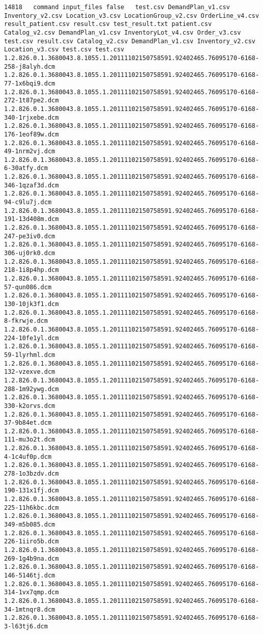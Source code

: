 \begin{lstlisting}
14818	command	input_files	false	test.csv DemandPlan_v1.csv Inventory_v2.csv Location_v3.csv LocationGroup_v2.csv OrderLine_v4.csv result_patient.csv result.csv test_result.txt patient.csv Catalog_v2.csv DemandPlan_v1.csv InventoryLot_v4.csv Order_v3.csv test.csv result.csv Catalog_v2.csv DemandPlan_v1.csv Inventory_v2.csv Location_v3.csv test.csv test.csv 1.2.826.0.1.3680043.8.1055.1.20111102150758591.92402465.76095170-6168-258-j8alyh.dcm 1.2.826.0.1.3680043.8.1055.1.20111102150758591.92402465.76095170-6168-77-1x6bqi9.dcm 1.2.826.0.1.3680043.8.1055.1.20111102150758591.92402465.76095170-6168-272-1t87pe2.dcm 1.2.826.0.1.3680043.8.1055.1.20111102150758591.92402465.76095170-6168-340-1rjxebe.dcm 1.2.826.0.1.3680043.8.1055.1.20111102150758591.92402465.76095170-6168-176-1eof89w.dcm 1.2.826.0.1.3680043.8.1055.1.20111102150758591.92402465.76095170-6168-49-1nrm2vj.dcm 1.2.826.0.1.3680043.8.1055.1.20111102150758591.92402465.76095170-6168-6-30atfy.dcm 1.2.826.0.1.3680043.8.1055.1.20111102150758591.92402465.76095170-6168-346-1qzaf3d.dcm 1.2.826.0.1.3680043.8.1055.1.20111102150758591.92402465.76095170-6168-94-c9lu7j.dcm 1.2.826.0.1.3680043.8.1055.1.20111102150758591.92402465.76095170-6168-191-13d408m.dcm 1.2.826.0.1.3680043.8.1055.1.20111102150758591.92402465.76095170-6168-247-pe3iv0.dcm 1.2.826.0.1.3680043.8.1055.1.20111102150758591.92402465.76095170-6168-306-uj0rk0.dcm 1.2.826.0.1.3680043.8.1055.1.20111102150758591.92402465.76095170-6168-218-1i8p4hp.dcm 1.2.826.0.1.3680043.8.1055.1.20111102150758591.92402465.76095170-6168-57-qun086.dcm 1.2.826.0.1.3680043.8.1055.1.20111102150758591.92402465.76095170-6168-130-10jk3f1.dcm 1.2.826.0.1.3680043.8.1055.1.20111102150758591.92402465.76095170-6168-8-fkrwje.dcm 1.2.826.0.1.3680043.8.1055.1.20111102150758591.92402465.76095170-6168-224-10fe1yl.dcm 1.2.826.0.1.3680043.8.1055.1.20111102150758591.92402465.76095170-6168-59-1lyrhml.dcm 1.2.826.0.1.3680043.8.1055.1.20111102150758591.92402465.76095170-6168-132-vzexve.dcm 1.2.826.0.1.3680043.8.1055.1.20111102150758591.92402465.76095170-6168-288-1m92ywg.dcm 1.2.826.0.1.3680043.8.1055.1.20111102150758591.92402465.76095170-6168-330-k2orvs.dcm 1.2.826.0.1.3680043.8.1055.1.20111102150758591.92402465.76095170-6168-37-9b84et.dcm 1.2.826.0.1.3680043.8.1055.1.20111102150758591.92402465.76095170-6168-111-mu3o2t.dcm 1.2.826.0.1.3680043.8.1055.1.20111102150758591.92402465.76095170-6168-4-1c4uf0p.dcm 1.2.826.0.1.3680043.8.1055.1.20111102150758591.92402465.76095170-6168-278-1o3bzdv.dcm 1.2.826.0.1.3680043.8.1055.1.20111102150758591.92402465.76095170-6168-190-131x1fj.dcm 1.2.826.0.1.3680043.8.1055.1.20111102150758591.92402465.76095170-6168-225-11h6kbc.dcm 1.2.826.0.1.3680043.8.1055.1.20111102150758591.92402465.76095170-6168-349-m5b085.dcm 1.2.826.0.1.3680043.8.1055.1.20111102150758591.92402465.76095170-6168-226-1iiro5b.dcm 1.2.826.0.1.3680043.8.1055.1.20111102150758591.92402465.76095170-6168-269-1g4b9na.dcm 1.2.826.0.1.3680043.8.1055.1.20111102150758591.92402465.76095170-6168-146-5146tj.dcm 1.2.826.0.1.3680043.8.1055.1.20111102150758591.92402465.76095170-6168-314-1vx7qmp.dcm 1.2.826.0.1.3680043.8.1055.1.20111102150758591.92402465.76095170-6168-34-1mtnqr8.dcm 1.2.826.0.1.3680043.8.1055.1.20111102150758591.92402465.76095170-6168-3-l63tj6.dcm 
\end{lstlisting}
